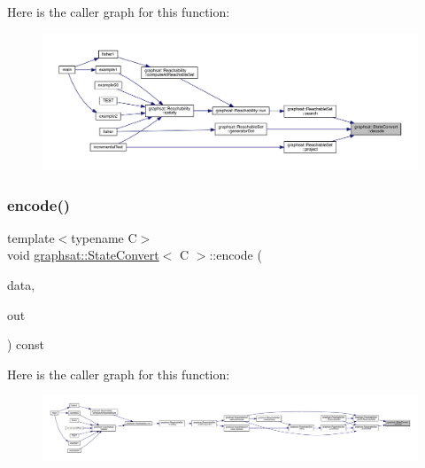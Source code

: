 Here is the caller graph for this function\+:
\nopagebreak
\begin{figure}[H]
\begin{center}
\leavevmode
\includegraphics[width=350pt]{classgraphsat_1_1_state_convert_a63207afc56e9b32bba4ee4477802b6c9_icgraph}
\end{center}
\end{figure}
\mbox{\label{classgraphsat_1_1_state_convert_a81b6e8eaa165d879745c3ccfbe13182a}} 
\subsubsection{\texorpdfstring{encode()}{encode()}}
{\footnotesize\ttfamily template$<$typename C$>$ \\
void \mbox{\hyperlink{classgraphsat_1_1_state_convert}{graphsat\+::\+State\+Convert}}$<$ C $>$\+::encode (\begin{DoxyParamCaption}\item[{const C $\ast$}]{data,  }\item[{\mbox{\hyperlink{namespacegraphsat_aa3b3d61a8c27ffc03448c5e1f3a76aed}{U\+I\+NT}} $\ast$}]{out }\end{DoxyParamCaption}) const\hspace{0.3cm}{\ttfamily [inline]}}

Here is the caller graph for this function\+:
\nopagebreak
\begin{figure}[H]
\begin{center}
\leavevmode
\includegraphics[width=350pt]{classgraphsat_1_1_state_convert_a81b6e8eaa165d879745c3ccfbe13182a_icgraph}
\end{center}
\end{figure}
\mbox{\label{classgraphsat_1_1_state_convert_a94c8e2ac6473c876b3b4bab2725aab04}} 
